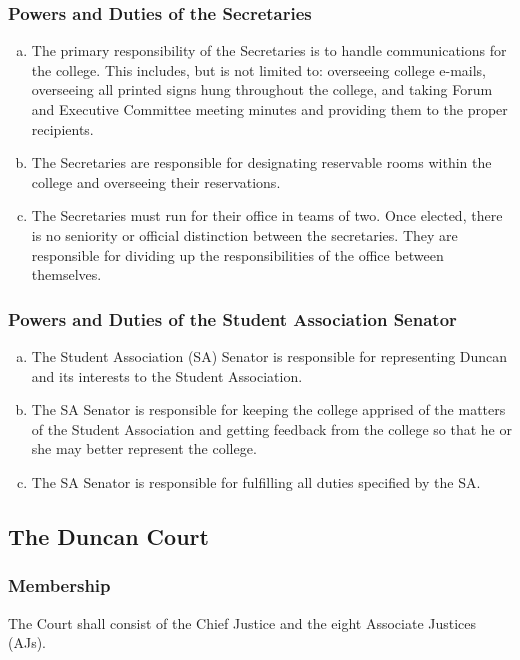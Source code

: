 \documentclass[USletter,12pt]{article}
\begin{document}
\begin{enumerate}[(a)]
\subsubsection{Powers and Duties of the Secretaries}
\begin{enumerate}[(a)]
\item The primary responsibility of the Secretaries is to handle communications for the college.  This includes, but is not limited to: overseeing college e-mails, overseeing all printed signs hung throughout the college, and taking Forum and Executive Committee meeting minutes and providing them to the proper recipients.
\item The Secretaries are responsible for designating reservable rooms within the college and overseeing their reservations.
\item The Secretaries must run for their office in teams of two.  Once elected, there is no seniority or official distinction between the secretaries.  They are responsible for dividing up the responsibilities of the office between themselves.
\end{enumerate}

\subsubsection{Powers and Duties of the Student Association Senator}
\begin{enumerate}[(a)]
\item The Student Association (SA) Senator is responsible for representing Duncan and its interests to the Student Association.
\item The SA Senator is responsible for keeping the college apprised of the matters of the Student Association and getting feedback from the college so that he or she may better represent the college.
\item The SA Senator is responsible for fulfilling all duties specified by the SA.
\end{enumerate}

\subsection{The Duncan Court}
\subsubsection{Membership}
The Court shall consist of the Chief Justice and the eight Associate Justices (AJs).


\end{enumerate}
\end{document}
